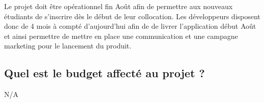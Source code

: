 	Le projet doit être opérationnel fin Août afin de permettre aux nouveaux étudiants de s'inscrire dès le début de leur collocation. Les développeurs disposent donc de 4 mois à compté d'aujourd'hui afin de de livrer l'application début Août et ainsi permettre de mettre en place une communication et une campagne marketing pour le lancement du produit.


\subsection{Quel est le budget affecté au projet ?} %
\label{sub:quel_est_le_budget_affect_au_projet}

	N/A
	

